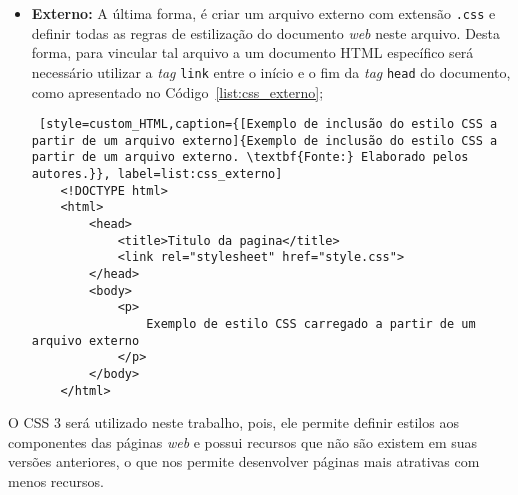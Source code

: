 \begin{itemize}
	\item \textbf{Externo:} A última forma, é criar um arquivo externo com extensão \texttt{.css} e definir todas as regras de estilização do documento \textit{web} neste arquivo. Desta forma, para vincular tal arquivo a um documento HTML específico será necessário utilizar a \textit{tag} \texttt{link} entre o início e o fim da \textit{tag} \texttt{head} do documento, como apresentado no Código~\ref{list:css_externo};
	
	\begin{lstlisting} [style=custom_HTML,caption={[Exemplo de inclusão do estilo CSS a partir de um arquivo externo]{Exemplo de inclusão do estilo CSS a partir de um arquivo externo. \textbf{Fonte:} Elaborado pelos autores.}}, label=list:css_externo] 	
	<!DOCTYPE html>
	<html>
		<head>
			<title>Titulo da pagina</title>
			<link rel="stylesheet" href="style.css">
		</head>
		<body>
			<p>
				Exemplo de estilo CSS carregado a partir de um arquivo externo
			</p>
		</body>
	</html>
	\end{lstlisting}
	
	
\end{itemize}

O CSS 3 será utilizado neste trabalho, pois, ele permite definir estilos aos componentes das páginas \textit{web} e possui recursos que não são existem em suas versões anteriores, o que nos permite desenvolver páginas mais atrativas com menos recursos.